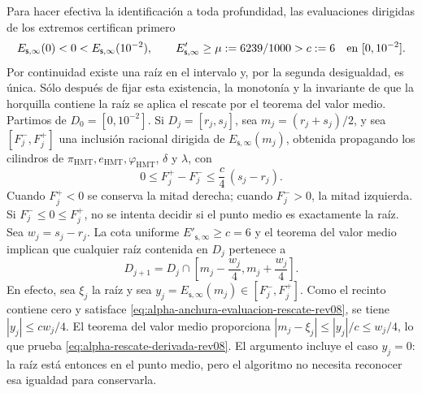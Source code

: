 Para hacer efectiva la identificación a toda profundidad, las evaluaciones
dirigidas de los extremos certifican primero
\[
 E_{\mathsf s,\infty}(0)<0<
 E_{\mathsf s,\infty}(10^{-2}),
 \qquad
 E'_{\mathsf s,\infty}\geq\mu:=6239/1000>c:=6
 \quad\hbox{en }[0,10^{-2}].
\]
Por continuidad existe una raíz en el intervalo y, por la segunda desigualdad,
es única. Sólo después de fijar esta existencia, la monotonía y la invariante
de que la horquilla contiene la raíz se aplica el rescate por el teorema del
valor medio. Partimos de \(D_0=[0,10^{-2}]\). Si
\(D_j=[r_j,s_j]\), sea \(m_j=(r_j+s_j)/2\), y sea
\([F_j^-,F_j^+]\) una inclusión racional dirigida de
\(E_{\mathsf s,\infty}(m_j)\), obtenida propagando los cilindros de
\(\pi_{\mathrm{HMT}},e_{\mathrm{HMT}},\varphi_{\mathrm{HMT}}\),
\(\delta\) y \(\lambda\), con
\begin{equation}
 0\leq F_j^+-F_j^-\leq \frac{c}{4}\,(s_j-r_j).
 \label{eq:alpha-anchura-evaluacion-rescate-rev08}
\end{equation}
Cuando \(F_j^+<0\) se conserva la mitad derecha;
cuando \(F_j^->0\), la mitad izquierda. Si
\(F_j^-\leq0\leq F_j^+\), no se intenta decidir si el punto medio es
exactamente la raíz. Sea \(w_j=s_j-r_j\). La cota uniforme
\(E'_{\mathsf s,\infty}\geq c=6\) y el teorema del valor medio implican que
cualquier raíz contenida en \(D_j\) pertenece a
\begin{equation}
 D_{j+1}=D_j\cap
 \left[m_j-\frac{w_j}{4},
             m_j+\frac{w_j}{4}\right].
 \label{eq:alpha-rescate-derivada-rev08}
\end{equation}
En efecto, sea \(\xi_j\) la raíz y sea
\(y_j=E_{\mathsf s,\infty}(m_j)\in[F_j^-,F_j^+]\). Como el recinto contiene
cero y satisface \eqref{eq:alpha-anchura-evaluacion-rescate-rev08}, se tiene
\(|y_j|\leq cw_j/4\). El teorema del valor medio proporciona
\(|m_j-\xi_j|\leq |y_j|/c\leq w_j/4\), lo que prueba
\eqref{eq:alpha-rescate-derivada-rev08}. El argumento incluye el caso
\(y_j=0\): la raíz está entonces en el punto medio, pero el algoritmo no
necesita reconocer esa igualdad para conservarla.

